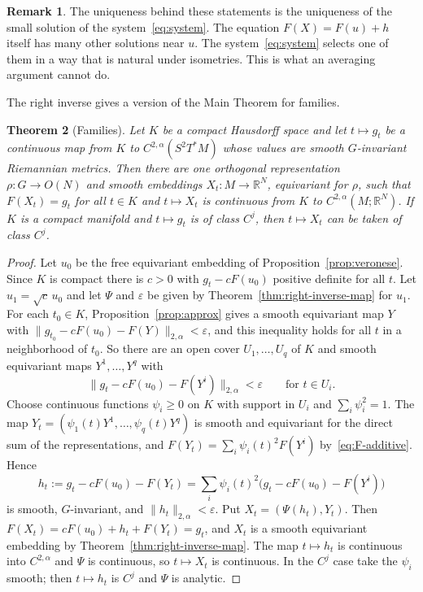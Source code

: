 \documentclass[11pt]{amsart}
\newtheorem{theorem}{Theorem}[section]
\theoremstyle{definition}
\newtheorem{remark}[theorem]{Remark}
\newcommand{\R}{\mathbb{R}}
\begin{document}
\begin{remark}
The uniqueness behind these statements is the uniqueness of the small solution of the
system~\eqref{eq:system}. The equation $F(X)=F(u)+h$ itself has many other solutions near $u$.
The system~\eqref{eq:system} selects one of them in a way that is natural under isometries.
This is what an averaging argument cannot do.
\end{remark}

The right inverse gives a version of the Main Theorem for families.

\begin{theorem}[Families]\label{thm:families}
Let $K$ be a compact Hausdorff space and let $t\mapsto g_t$ be a continuous map from $K$ to
$C^{2,\alpha}(S^2T^*M)$ whose values are smooth $G$-invariant Riemannian metrics. Then there are
one orthogonal representation $\rho\colon G\to O(N)$ and smooth embeddings $X_t\colon M\to\R^N$,
equivariant for $\rho$, such that $F(X_t)=g_t$ for all $t\in K$ and $t\mapsto X_t$ is continuous
from $K$ to $C^{2,\alpha}(M;\R^N)$. If $K$ is a compact manifold and $t\mapsto g_t$ is of class
$C^j$, then $t\mapsto X_t$ can be taken of class $C^j$.
\end{theorem}

\begin{proof}
Let $u_0$ be the free equivariant embedding of Proposition~\ref{prop:veronese}. Since $K$ is
compact there is $c>0$ with $g_t-cF(u_0)$ positive definite for all $t$. Let $u_1=\sqrt c\,u_0$
and let $\Psi$ and $\varepsilon$ be given by Theorem~\ref{thm:right-inverse-map} for $u_1$. For
each $t_0\in K$, Proposition~\ref{prop:approx} gives a smooth equivariant map $Y$ with
$\|g_{t_0}-cF(u_0)-F(Y)\|_{2,\alpha}<\varepsilon$, and this inequality holds for all $t$ in a
neighborhood of $t_0$. So there are an open cover $U_1,\dots,U_q$ of $K$ and smooth equivariant
maps $Y^1,\dots,Y^q$ with
\[
\|g_t-cF(u_0)-F(Y^i)\|_{2,\alpha}<\varepsilon\qquad\text{for }t\in U_i .
\]
Choose continuous functions $\psi_i\ge0$ on $K$ with support in $U_i$ and $\sum_i\psi_i^2=1$.
The map $Y_t=(\psi_1(t)Y^1,\dots,\psi_q(t)Y^q)$ is smooth and equivariant for the direct sum of
the representations, and $F(Y_t)=\sum_i\psi_i(t)^2F(Y^i)$ by~\eqref{eq:F-additive}. Hence
\[
h_t:=g_t-cF(u_0)-F(Y_t)=\sum_i\psi_i(t)^2\bigl(g_t-cF(u_0)-F(Y^i)\bigr)
\]
is smooth, $G$-invariant, and $\|h_t\|_{2,\alpha}<\varepsilon$. Put $X_t=(\Psi(h_t),Y_t)$. Then
$F(X_t)=cF(u_0)+h_t+F(Y_t)=g_t$, and $X_t$ is a smooth equivariant embedding by
Theorem~\ref{thm:right-inverse-map}. The map $t\mapsto h_t$ is continuous into $C^{2,\alpha}$ and
$\Psi$ is continuous, so $t\mapsto X_t$ is continuous. In the $C^j$ case take the $\psi_i$ smooth;
then $t\mapsto h_t$ is $C^j$ and $\Psi$ is analytic.
\end{proof}
\end{document}
